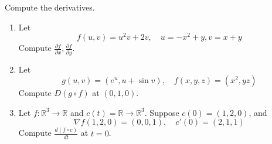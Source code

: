 \documentclass[openany]{book}
\newcommand{\R}{\mathbb{R}}
\begin{document}
\newpage
\begin{prob}
    Compute the derivatives.
    \begin{enumerate}
        \item Let
        \begin{equation*}
            f(u,v)=u^2v+2v, \quad u=-x^2+y, v=x+y
        \end{equation*}
        Compute $\frac{\partial f}{\partial x},\frac{\partial f}{\partial y}$.
        \item Let 
        \begin{equation*}
            g(u,v)=(e^u, u+\sin v), \quad f(x,y,z)=(x^2, yz)
        \end{equation*}
        Compute $D(g\circ f)$ at $(0,1,0)$.
        \item Let $f:\R^3\to\R$ and $c(t)=\R\to\R^3$. Suppose $c(0)=(1,2,0)$, and 
        \begin{equation*}
            \nabla f(1,2,0)=(0,0,1), \quad c'(0)=(2,1,1)
        \end{equation*}
        Compute $\frac{d(f\circ c)}{dt}$ at $t=0$.
    \end{enumerate}
\end{prob}
\newpage
\end{document}
